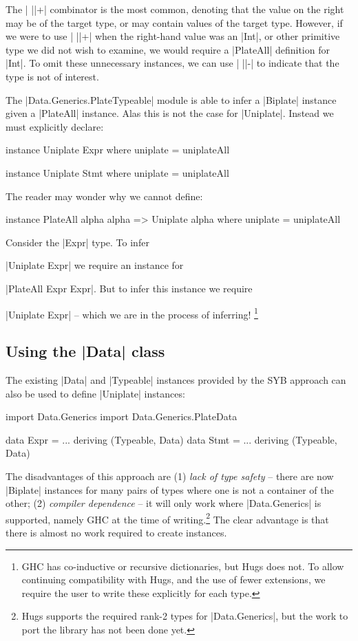 The | ||+| combinator is the most common, denoting that the value on the right may be of the target type, or may contain values of the target type. However, if we were to use | ||+| when the right-hand value was an |Int|, or other primitive type we did not wish to examine, we would require a |PlateAll| definition for |Int|. To omit these unnecessary instances, we can use | ||-| to indicate that the type is not of interest.

The |Data.Generics.PlateTypeable| module is able to infer a |Biplate| instance given a |PlateAll| instance. Alas this is not the case for |Uniplate|. Instead we must explicitly declare:

\begin{code}
instance Uniplate Expr where
    uniplate = uniplateAll

instance Uniplate Stmt where
    uniplate = uniplateAll
\end{code}

The reader may wonder why we cannot define:

\begin{code}
instance PlateAll alpha alpha => Uniplate alpha where
    uniplate = uniplateAll
\end{code}

Consider the |Expr| type. To infer \ignore|Uniplate Expr| we require an instance for \ignore|PlateAll Expr Expr|. But to infer this instance we require \ignore|Uniplate Expr| -- which we are in the process of inferring! \footnote{GHC has co-inductive or recursive dictionaries, but Hugs does not. To allow continuing compatibility with Hugs, and the use of fewer extensions, we require the user to write these explicitly for each type.}


\subsection{Using the |Data| class}
\label{secU:implement_playdata}

The existing |Data| and |Typeable| instances provided by the SYB approach can also be used to define |Uniplate| instances:

\ignore\begin{code}
import Data.Generics
import Data.Generics.PlateData

data Expr  = ... \? \? deriving (Typeable, Data)
data Stmt  = ... \? \? deriving (Typeable, Data)
\end{code}

The disadvantages of this approach are (1) \textit{lack of type safety} -- there are now |Biplate| instances for many pairs of types where one is not a container of the other; (2) \textit{compiler dependence} -- it will only work where |Data.Generics| is supported, namely GHC at the time of writing.\footnote{Hugs supports the required rank-2 types for |Data.Generics|, but the work to port the library has not been done yet.} The clear advantage is that there is almost no work required to create instances.

